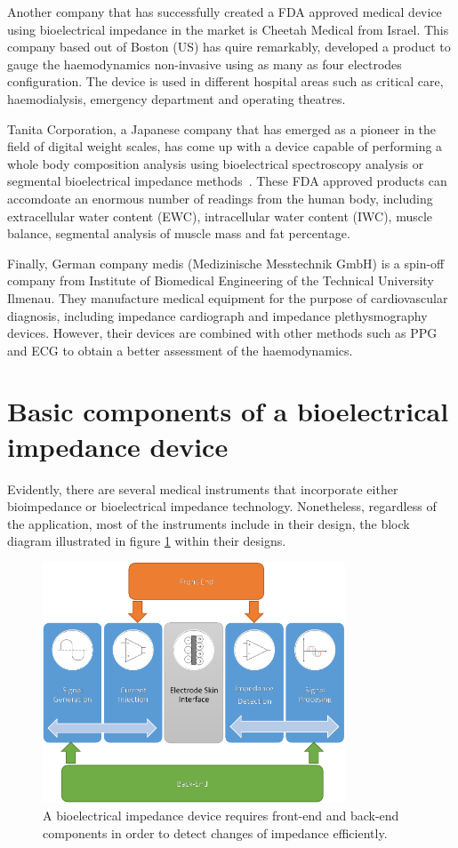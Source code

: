 Another company that has successfully created a FDA approved medical device using bioelectrical impedance in the market is Cheetah Medical \cite{cheetah} from Israel. This company based out of Boston (US) has quire remarkably, developed a product to gauge the haemodynamics non-invasive using as many as four electrodes configuration. The device is used in different hospital areas such as critical care, haemodialysis, emergency department and operating theatres.

Tanita Corporation, a Japanese company that has emerged as a pioneer in the field of digital weight scales, has come up with a device capable of performing a whole body composition analysis using bioelectrical spectroscopy analysis or segmental bioelectrical impedance methods~\cite{tanita}. These FDA approved products can accomdoate an enormous number of readings from the human body, including extracellular water content (EWC), intracellular water content (IWC), muscle balance, segmental analysis of muscle mass and fat percentage.

Finally, German company medis (Medizinische Messtechnik GmbH) \cite{medis} is a spin-off company from Institute of Biomedical Engineering of the Technical University Ilmenau. They manufacture medical equipment for the purpose of cardiovascular diagnosis, including impedance cardiograph and impedance plethysmography devices. However, their devices are combined with other methods such as PPG and ECG to obtain a better assessment of the haemodynamics. 

\section{Basic components of a bioelectrical impedance device}
\label{section impedance basic}
Evidently, there are several medical instruments that incorporate either bioimpedance or bioelectrical impedance technology. Nonetheless, regardless of the application, most of the instruments include in their design, the block diagram illustrated in figure \ref{fig:block diagram bioimpedance} within their designs. 

\begin{figure}[!htpb]
	\centering
	\includegraphics[width=9cm,keepaspectratio]{figure11}    
	\caption[Block diagram of a common bioimpedance device]{A bioelectrical impedance device requires front-end and back-end components in order to detect changes of impedance efficiently.}
	\label{fig:block diagram bioimpedance}
\end{figure}

